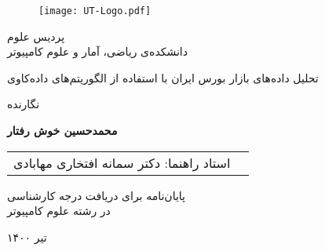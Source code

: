 \documentclass[12pt]{report}
\begin{document}

\begin{figure}
\centering
\texttt{[image: UT-Logo.pdf]}
\end{figure}

\begin{center}
پردیس علوم
\\
دانشکده‌ی ریاضی، آمار و علوم کامپیوتر
\end{center}

\begin{center}
\end{center}

\begin{center}
\huge{ تحلیل داده‌های بازار بورس ایران با استفاده از الگوریتم‌های داده‌کاوی}
\end{center}

\begin{center}
\end{center}

\begin{center}
نگارنده
\end{center}
\begin{center}
\textbf{
محمدحسین خوش رفتار 
}
\end{center}

\begin{center}
\begin{tabular}{rr}
استاد راهنما: دکتر سمانه افتخاری مهابادی
\end{tabular}
\end{center}

\vspace{3cm}
\begin{center}
پایان‌نامه برای دریافت درجه کارشناسی
\\
در رشته علوم کامپیوتر
\end{center}

\begin{center}
تیر ۱۴۰۰
\end{center}

\pagestyle{empty}
\pagenumbering{}

\newpage
\pagestyle{plain}
\setcounter{page}{1}
\doublespacing{}
\chapter*{}
\end{document}

